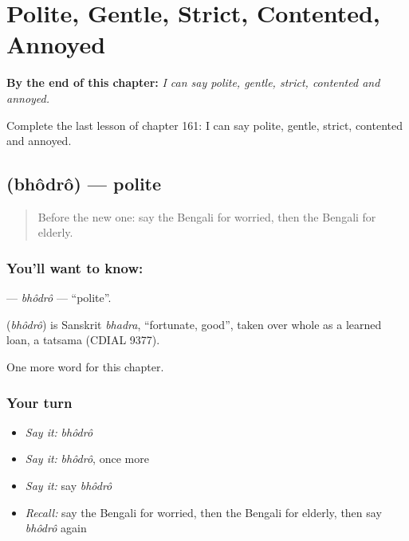 
\chapter{Polite, Gentle, Strict, Contented, Annoyed}
\label{ch:bn-polite-gentle-strict-contented-annoyed}

\begin{chapteropening}
\textbf{By the end of this chapter:} \emph{I can say polite, gentle, strict, contented and annoyed.}

Complete the last lesson of chapter 161: I can say polite, gentle, strict, contented and annoyed.
\end{chapteropening}

\section[\texorpdfstring{\bn{ভদ্র} (bhôdrô)}{ভদ্র (bhôdrô)}]{ (bhôdrô) — polite}

\label{lesson:BN-C161-bhodro}



\begin{quote}
Before the new one: say the Bengali for worried, then the Bengali for elderly.
\end{quote}

\subsection*{You'll want to know: }
\textbf{} — \emph{bhôdrô} — \textquotedblleft{}polite\textquotedblright{}.

\begin{cousinweb}
\textbf{} (\emph{bhôdrô}) is Sanskrit \emph{bhadra}, \textquotedblleft{}fortunate, good\textquotedblright{}, taken over whole as a learned loan, a tatsama (CDIAL 9377).
\end{cousinweb}

\begin{grammarlens}[title={What you've built}]
One more word for this chapter.
\end{grammarlens}

\subsection*{Your turn}
\begin{itemize}
\raggedright
  \item \emph{Say it:} \emph{bhôdrô}
  \item \emph{Say it:} \emph{bhôdrô}, once more
  \item \emph{Say it:} say \emph{bhôdrô}
  \item \emph{Recall:} say the Bengali for worried, then the Bengali for elderly, then say \emph{bhôdrô} again
\end{itemize}

